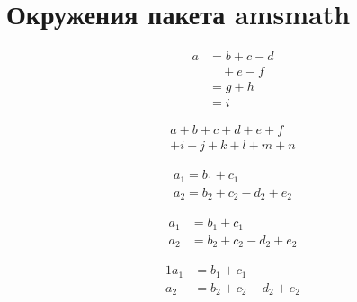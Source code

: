 \section{Окружения пакета amsmath}
\begin{equation}\label{eq:one}
\begin{split}
  a & = b+c-d\\
    & \quad +e-f\\
    & =g+h\\
    & =i
\end{split}
\end{equation}

\begin{multline}
a+b+c+d+e+f\\
+i+j+k+l+m+n
\end{multline}

\begin{gather}
a_1=b_1+c_1\\
a_2=b_2+c_2-d_2+e_2
\end{gather}

\begin{align}
a_1& =b_1+c_1\\
a_2& =b_2+c_2-d_2+e_2
\end{align}

\begin{alignat}{1}
  a_1& =b_1+c_1\\
  a_2& =b_2+c_2-d_2+e_2
\end{alignat}